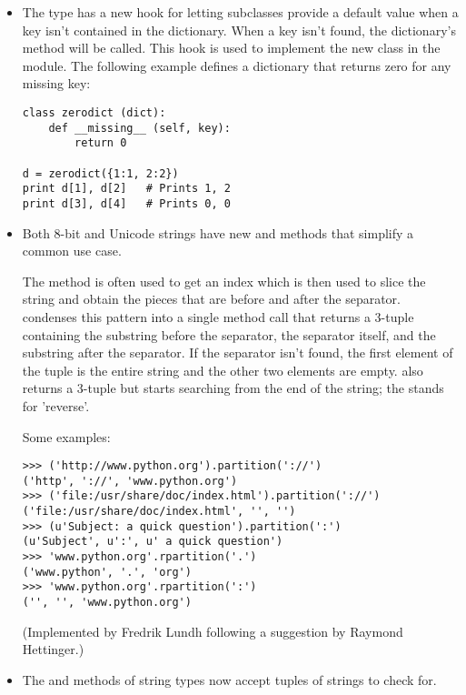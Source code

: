 \documentclass{howto}
\begin{document}
\begin{itemize}

\item The  type has a new hook for letting subclasses
provide a default value when a key isn't contained in the dictionary.
When a key isn't found, the dictionary's
method will be called.  This hook is used to implement
the new  class in the 
module.  The following example defines a dictionary 
that returns zero for any missing key:

\begin{verbatim}
class zerodict (dict):
    def __missing__ (self, key):
        return 0

d = zerodict({1:1, 2:2})
print d[1], d[2]   # Prints 1, 2
print d[3], d[4]   # Prints 0, 0
\end{verbatim}

\item Both 8-bit and Unicode strings have new  
and  methods that simplify a common use case.

The  method is often used to get an index which is
then used to slice the string and obtain the pieces that are before
and after the separator.  
 condenses this
pattern into a single method call that returns a 3-tuple containing
the substring before the separator, the separator itself, and the
substring after the separator.  If the separator isn't found, the
first element of the tuple is the entire string and the other two
elements are empty.   also returns a 3-tuple
but starts searching from the end of the string; the  stands
for 'reverse'.

Some examples:

\begin{verbatim}
>>> ('http://www.python.org').partition('://')
('http', '://', 'www.python.org')
>>> ('file:/usr/share/doc/index.html').partition('://')
('file:/usr/share/doc/index.html', '', '')
>>> (u'Subject: a quick question').partition(':')
(u'Subject', u':', u' a quick question')
>>> 'www.python.org'.rpartition('.')
('www.python', '.', 'org')
>>> 'www.python.org'.rpartition(':')
('', '', 'www.python.org')
\end{verbatim}

(Implemented by Fredrik Lundh following a suggestion by Raymond Hettinger.)

\item The  and  methods
of string types now accept tuples of strings to check for.


\end{itemize}
\end{document}
